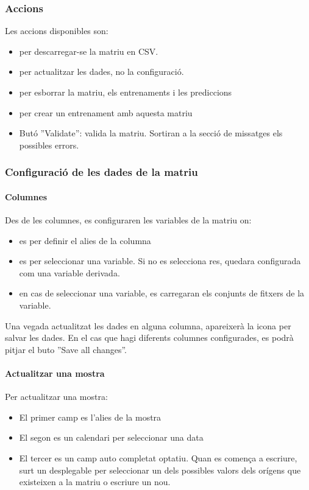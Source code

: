 \subsubsection{Accions} 
Les accions disponibles son:
\begin{itemize} 
\item \icondownload per descarregar-se la matriu en CSV.
\item \iconupdate per actualitzar les dades, no la configuració.
\item \icontrash per esborrar la matriu, els entrenaments i les prediccions
\item \icontraining per crear un entrenament amb aquesta matriu
\item But\'{o} ''Validate'': valida la matriu. Sortiran a la secció de missatges els possibles errors.
\end{itemize}

\phantonsection
\label{matrixConfiguration}
\subsubsection{Configuració de les dades de la matriu}
\paragraph*{Columnes} Des de les columnes, es configuraren les variables de la matriu on:
\begin{itemize}
\item \iconalias es per definir el alies de la columna
\item \iconvariable es per seleccionar una variable. Si no es selecciona res, quedara configurada com una variable derivada.
\item \iconseason en cas de seleccionar una variable, es carregaran els conjunts de fitxers de la variable.
\end{itemize}
Una vegada actualitzat les dades en alguna columna, apareixerà la icona \iconedit per salvar les dades. En el cas que hagi diferents columnes configurades, es podrà pitjar el buto ''Save all changes''.

\paragraph*{Actualitzar una mostra} Per actualitzar una mostra:
\begin{itemize}
\item El primer camp es l'alies de la mostra
\item El segon es un calendari per seleccionar una data
\item El tercer es un camp auto completat optatiu. Quan es comença a escriure, surt un desplegable per seleccionar un dels possibles valors dels orígens que existeixen a la matriu o escriure un nou.
\end{itemize}

